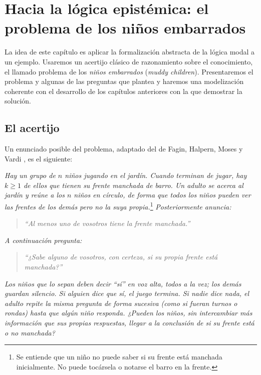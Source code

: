 \chapter{Hacia la lógica epistémica: el problema de los niños embarrados}
\label{sec:muddy}

La idea de este capítulo es aplicar la formalización abstracta de la lógica modal a un ejemplo. Usaremos un acertijo clásico de razonamiento sobre el conocimiento, el llamado problema de los \emph{niños embarrados} (\emph{muddy children}). Presentaremos el problema y algunas de las preguntas que
plantea y haremos una modelización coherente con el desarrollo de los capítulos anteriores con la que demostrar la solución.

\section{El acertijo}\label{sec:acertijo}

Un enunciado posible del problema, adaptado del de Fagin, Halpern, Moses y Vardi \cite[§1.1]{fhmv}, es el siguiente:

\vspace{3mm}

\emph{Hay un grupo de $n$ niños jugando en el jardín. Cuando terminan de jugar, hay $k \ge 1$ de ellos que tienen su frente manchada de barro. Un adulto se acerca al jardín y reúne a los $n$ niños en círculo, de forma que todos los niños pueden ver las frentes de los demás pero no la suya propia.}\footnote{Se entiende que un niño no puede saber si su frente está manchada inicialmente. No puede tocársela o notarse el barro en la frente.} \emph{Posteriormente anuncia:}

\begin{quote}
  \emph{``Al menos uno de vosotros tiene la frente manchada.''}
\end{quote}

\emph{A continuación pregunta:}

\begin{quote}
  \emph{``¿Sabe alguno de vosotros, con certeza, si su propia frente está manchada?''}
\end{quote}

\emph{Los niños que lo sepan deben decir ``sí'' en voz alta, todos a la vez; los demás guardan silencio. Si alguien dice que sí, el juego termina. Si nadie dice nada, el adulto repite la misma pregunta de forma sucesiva (como si fueran turnos o rondas) hasta que algún niño responda. ¿Pueden los niños, sin intercambiar más información que sus propias respuestas, llegar a la conclusión de si su frente está o no manchada?}

